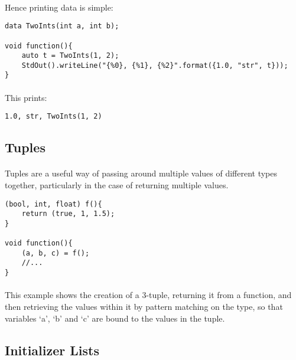 \documentclass[12pt,twoside,notitlepage]{report}
\begin{document}
\paragraph{}
Hence printing data is simple:

\begin{lstlisting}
data TwoInts(int a, int b);

void function(){
	auto t = TwoInts(1, 2);
	StdOut().writeLine("{%0}, {%1}, {%2}".format({1.0, "str", t}));
}
\end{lstlisting}

\paragraph{}
This prints:

\begin{verbatim}
1.0, str, TwoInts(1, 2)
\end{verbatim}

\subsection{Tuples}

\paragraph{}
Tuples are a useful way of passing around multiple values of different types together, particularly in the case of returning multiple values.

\begin{lstlisting}
(bool, int, float) f(){
	return (true, 1, 1.5);
}

void function(){
	(a, b, c) = f();
	//...
}
\end{lstlisting}

\paragraph{}
This example shows the creation of a 3-tuple, returning it from a function, and then retrieving the values within it by pattern matching on the type, so that variables `a', `b' and `c' are bound to the values in the tuple.

\subsection{Initializer Lists}

\paragraph{}
\end{document}
